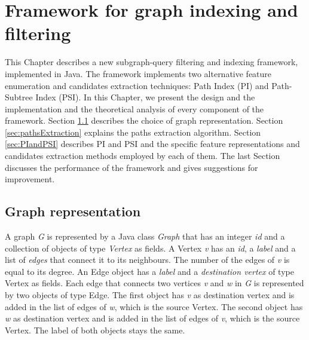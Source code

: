 \documentclass{l4proj}
\begin{document}


\chapter{Framework for graph indexing and filtering}
This Chapter describes a new subgraph-query filtering and indexing framework, implemented in Java. The framework implements two alternative feature enumeration and candidates extraction techniques: Path Index (PI) and Path-Subtree Index (PSI). In this Chapter, we present the design and the implementation and the theoretical analysis of every component of the framework. Section \ref{sec:graph-representation} describes the choice of graph representation. Section \ref{sec:pathsExtraction} explains the paths extraction algorithm. Section \ref{sec:PIandPSI} describes PI and PSI and the specific feature representations and candidates extraction methods employed by each of them. The last Section discusses the performance of the framework and gives suggestions for improvement.

\section{Graph representation}
\label{sec:graph-representation}
A graph \emph{G} is represented by a Java class \emph{Graph} that has an integer \emph{id} and a collection of objects of type \emph{Vertex} as fields. A Vertex \emph{v} has an \emph{id}, a \emph{label} and a list of \emph{edges} that connect it to its neighbours. The number of the edges of \emph{v} is equal to its degree. An Edge object has a \emph{label} and a \emph{destination vertex} of type Vertex as fields. Each edge that connects two vertices \emph{v} and \emph{w} in \emph{G} is represented by two objects of type Edge. The first object has \emph{v} as destination vertex and is added in the list of edges of \emph{w}, which is the source Vertex. The second object has \emph{w} as destination vertex and is added in the list of edges of \emph{v}, which is the source Vertex. The label of both objects stays the same.
\end{document}
